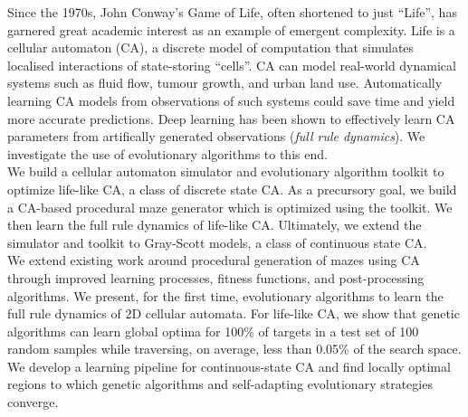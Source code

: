 
Since the 1970s, John Conway's Game of Life, often shortened to just ``Life'', has garnered great academic interest as an example of emergent complexity. Life is a cellular automaton (CA), a discrete model of computation that simulates localised interactions of state-storing ``cells''. CA can model real-world dynamical systems such as fluid flow\cite{wolf2004lattice}, tumour growth\cite{reher2017cell}, and urban land use\cite{white2000high}. Automatically learning CA models from observations of such systems could save time and yield more accurate predictions. Deep learning has been shown to effectively learn CA parameters from artifically generated observations (\textit{full rule dynamics})\cite{wulff1992learning}. We investigate the use of evolutionary algorithms to this end.\\

We build a cellular automaton simulator and evolutionary algorithm toolkit to optimize life-like CA, a class of discrete state CA. As a precursory goal, we build a CA-based procedural maze generator which is optimized using the toolkit. We then learn the full rule dynamics of life-like CA. Ultimately, we extend the simulator and toolkit to Gray-Scott models\cite{gray1983autocatalytic}, a class of continuous state CA.\\

We extend existing work around procedural generation of mazes using CA\cite{adams2017procedural} through improved learning processes, fitness functions, and post-processing algorithms. We present, for the first time, evolutionary algorithms to learn the full rule dynamics of 2D cellular automata. For life-like CA, we show that genetic algorithms can learn global optima for 100\% of targets in a test set of 100 random samples while traversing, on average, less than 0.05\% of the search space. We develop a learning pipeline for continuous-state CA and find locally optimal regions to which genetic algorithms and self-adapting evolutionary strategies converge.
